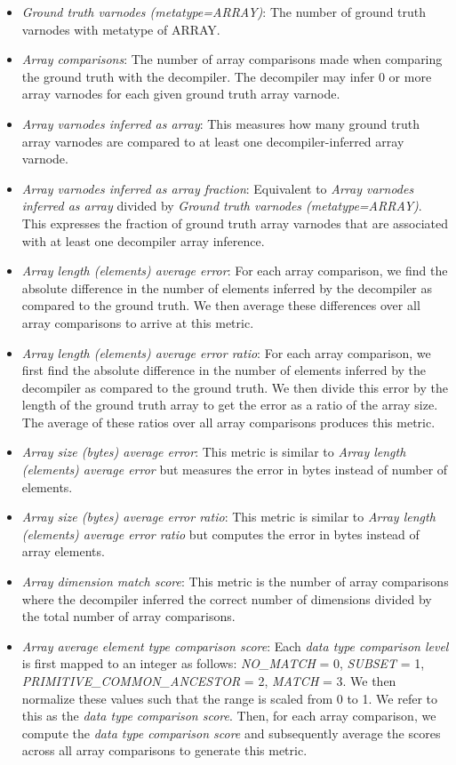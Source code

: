 \begin{itemize}
    \item \emph{Ground truth varnodes (metatype=ARRAY)}: The number of ground truth varnodes with metatype of ARRAY.
    \item \emph{Array comparisons}: The number of array comparisons made when comparing the ground truth with the decompiler. The decompiler may infer 0 or more array varnodes for each given ground truth array varnode.
    \item \emph{Array varnodes inferred as array}: This measures how many ground truth array varnodes are compared to at least one decompiler-inferred array varnode.
    \item \emph{Array varnodes inferred as array fraction}: Equivalent to \emph{Array varnodes inferred as array} divided by \emph{Ground truth varnodes (metatype=ARRAY)}. This expresses the fraction of ground truth array varnodes that are associated with at least one decompiler array inference.
    \item \emph{Array length (elements) average error}: For each array comparison, we find the absolute difference in the number of elements inferred by the decompiler as compared to the ground truth. We then average these differences over all array comparisons to arrive at this metric.
    \item \emph{Array length (elements) average error ratio}: For each array comparison, we first find the absolute difference in the number of elements inferred by the decompiler as compared to the ground truth. We then divide this error by the length of the ground truth array to get the error as a ratio of the array size. The average of these ratios over all array comparisons produces this metric.
    \item \emph{Array size (bytes) average error}: This metric is similar to \emph{Array length (elements) average error} but measures the error in bytes instead of number of elements.
    \item \emph{Array size (bytes) average error ratio}: This metric is similar to \emph{Array length (elements) average error ratio} but computes the error in bytes instead of array elements.
    \item \emph{Array dimension match score}: This metric is the number of array comparisons where the decompiler inferred the correct number of dimensions divided by the total number of array comparisons.
    \item \emph{Array average element type comparison score}: Each \emph{data type comparison level} is first mapped to an integer as follows: \emph{NO\_MATCH} = 0, \emph{SUBSET} = 1, \emph{PRIMITIVE\_COMMON\_ANCESTOR} = 2, \emph{MATCH} = 3. We then normalize these values such that the range is scaled from 0 to 1. We refer to this as the \emph{data type comparison score}. Then, for each array comparison, we compute the \emph{data type comparison score} and subsequently average the scores across all array comparisons to generate this metric.
\end{itemize}

